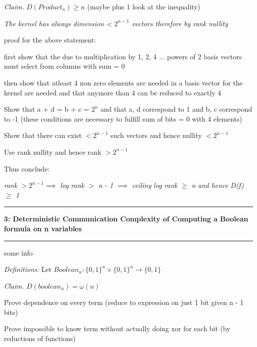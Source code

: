 \documentclass[11pt]{article}
\newcommand\question[2]{\vspace{.25in}\hrule\textbf{#1: #2}\vspace{.5em}\hrule\vspace{.10in}}
\newcommand\definitions{\emph{Definitions:}\newline}
\newcommand\claim{\emph{Claim.}\newline}
\begin{document}
\claim
$D(Product_n) \geq n$ (maybe plus 1 look at the inequality)

\proof
\emph{The kernel has always dimension < $2^{n - 1}$ vectors therefore by rank nullity}

proof for the above statement:

first show that the due to multiplication by 1, 2, 4 ... powers of 2 basis vectors must select from columns with sum = 0

then show that atleast 4 non zero elements are needed in a basis vector for the kernel are needed and that anymore than 4 can be reduced to exactly 4

Show that a + d = b + c = $2^n$ and that a, d correspond to 1 and b, c correspond to -1 (these conditions are necessary to fulfill sum of bits = 0 with 4 elements)

Show that there can exist $< 2 ^ {n - 1}$ such vectors and hence nullity $< 2 ^ {n - 1}$

Use rank nullity and hence rank $> 2 ^ {n - 1}$

Thus conclude:

\emph{rank $>  2^{n - 1} \implies$ log rank $>$ n - 1 $\implies$ ceiling log rank $\geq$ n and hence D(f) $\geq$ 1}

\newpage

\question{3}{Deterministic Communication Complexity of Computing a Boolean formula on n variables} 

some info

\definitions
Let $Boolean_n: {\{0, 1\}}^n \times {\{0, 1\}}^n \to \{0, 1\}$

\claim
$D(boolean_n) = \omega(n)$ 

\proof 
Prove dependence on every term (reduce to expression on just 1 bit given n - 1 bits)

Prove impossible to know term without actually doing xor for each bit  (by reductions of functions)

\newpage
\end{document}
